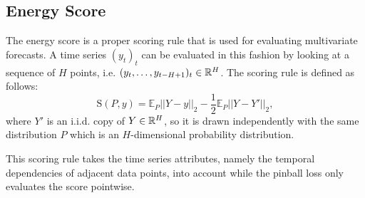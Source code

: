 \subsection{Energy Score}
\label{sec:energy-score-explanation}

The energy score is a proper scoring rule that is used for 
evaluating multivariate forecasts. A time series \((y_t)_t\) 
can be evaluated in this fashion by looking at a sequence of \(H\) 
points, i.e. \((y_t, \ldots, y_{t-H+1})_t \in \mathbb{R}^H\). 
The scoring rule is defined as follows:
\[ \mathrm{S}(P, y) = \mathbb{E}_P ||Y-y||_2 - \frac{1}{2} \mathbb{E}_P ||Y-Y'||_2, \]
where \(Y'\) is an i.i.d. copy of \(Y \in \mathbb{R}^H\), so it is drawn independently with the same distribution \(P\) 
which is an \(H\)-dimensional probability distribution.

This scoring rule takes the time series attributes, namely the 
temporal dependencies of adjacent data points, into account while 
the pinball loss only evaluates the score pointwise.